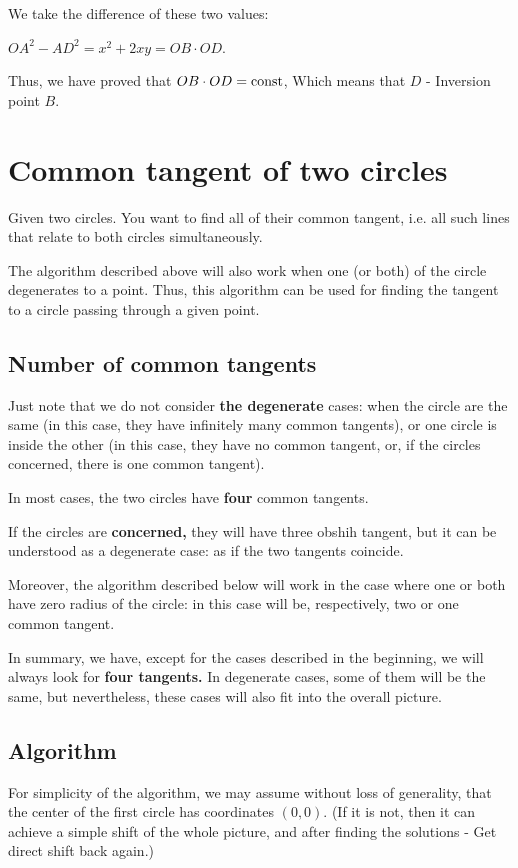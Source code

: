 We take the difference of these two values:

$OA ^ 2 - AD ^ 2 = x ^ 2 + 2xy = OB \cdot OD.$

Thus, we have proved that $OB \cdot OD = {\rm const}$, Which means that $D$ - Inversion point $B$.

\section{ Common tangent of two circles }
Given two circles. You want to find all of their common tangent, i.e. all such lines that relate to both circles simultaneously.

The algorithm described above will also work when one (or both) of the circle degenerates to a point. Thus, this algorithm can be used for finding the tangent to a circle passing through a given point.

\subsection{ Number of common tangents }

Just note that we do not consider \textbf{the degenerate} cases: when the circle are the same (in this case, they have infinitely many common tangents), or one circle is inside the other (in this case, they have no common tangent, or, if the circles concerned, there is one common tangent).

In most cases, the two circles have \textbf{four} common tangents.

If the circles are \textbf{concerned,} they will have three obshih tangent, but it can be understood as a degenerate case: as if the two tangents coincide.

Moreover, the algorithm described below will work in the case where one or both have zero radius of the circle: in this case will be, respectively, two or one common tangent.

In summary, we have, except for the cases described in the beginning, we will always look for \textbf{four tangents.} In degenerate cases, some of them will be the same, but nevertheless, these cases will also fit into the overall picture.

\subsection{ Algorithm }

For simplicity of the algorithm, we may assume without loss of generality, that the center of the first circle has coordinates $(0, 0)$. (If it is not, then it can achieve a simple shift of the whole picture, and after finding the solutions - Get direct shift back again.)

